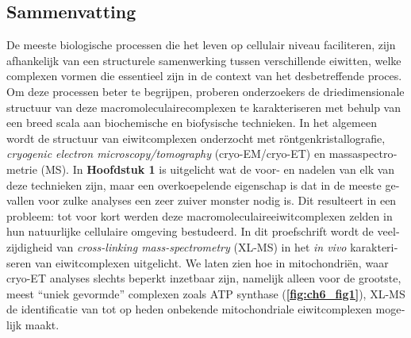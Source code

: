 \begin{otherlanguage}{dutch}
    \section{Sammenvatting}
    De meeste biologische processen die het leven op cellulair niveau faciliteren, zijn afhankelijk van een structurele samenwerking tussen verschillende eiwitten, welke complexen vormen die essentieel zijn in de context van het desbetreffende proces. Om deze processen beter te begrijpen, proberen onderzoekers de driedimensionale structuur van deze macromoleculairecomplexen te karakteriseren met behulp van een breed scala aan biochemische en biofysische technieken. In het algemeen wordt de structuur van eiwitcomplexen onderzocht met röntgenkristallografie, \emph{cryogenic electron microscopy/tomography} (cryo-EM/cryo-ET) en massaspectrometrie (MS). In \textbf{Hoofdstuk 1} is uitgelicht wat de voor- en nadelen van elk van deze technieken zijn, maar een overkoepelende eigenschap is dat in de meeste gevallen voor zulke analyses een zeer zuiver monster nodig is. Dit resulteert in een probleem: tot voor kort werden deze macromoleculaireeiwitcomplexen zelden in hun natuurlijke cellulaire omgeving bestudeerd. In dit proefschrift wordt de veelzijdigheid van \emph{cross-linking mass-spectrometry} (XL-MS) in het \emph{in vivo} karakteriseren van eiwitcomplexen uitgelicht. We laten zien hoe in mitochondriën, waar cryo-ET analyses slechts beperkt inzetbaar zijn, namelijk alleen voor de grootste, meest “uniek gevormde” complexen \cite{RN1} zoals ATP synthase (\textbf{\autoref{fig:ch6_fig1}}), XL-MS de identificatie van tot op heden onbekende mitochondriale eiwitcomplexen mogelijk maakt.


\end{otherlanguage}
